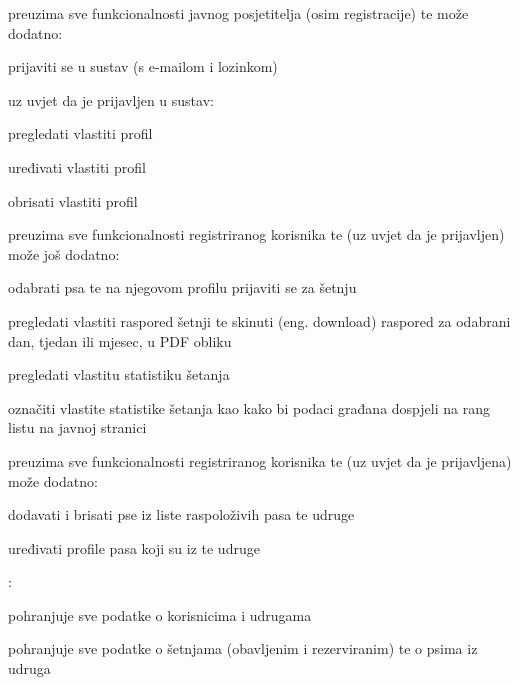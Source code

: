 \begin{packed_enum}
			\item  {} preuzima sve funkcionalnosti javnog posjetitelja (osim registracije) te može dodatno:
			\begin{packed_enum}
				\item prijaviti se u sustav (s e-mailom i lozinkom)
				\item uz uvjet da je prijavljen u sustav:
				\item[]
				\begin{packed_enum}
					\item pregledati vlastiti profil
					\item uređivati vlastiti profil
					\item obrisati vlastiti profil
				\end{packed_enum}	
			\end{packed_enum}
			\vspace{5mm}
		
			\item  {} preuzima sve funkcionalnosti registriranog korisnika te (uz uvjet da je prijavljen) može još dodatno:
			\begin{packed_enum}
				\item odabrati psa te na njegovom profilu prijaviti se za šetnju
				\item pregledati vlastiti raspored šetnji te skinuti (eng. download) raspored za odabrani dan, tjedan ili mjesec, u PDF obliku
				\item pregledati vlastitu statistiku šetanja
				\item označiti vlastite statistike šetanja kao  kako bi podaci građana dospjeli na rang listu na javnoj stranici
			\end{packed_enum}
			\vspace{5mm}
		
			\item  {} preuzima sve funkcionalnosti registriranog korisnika te (uz uvjet da je prijavljena) može dodatno:
			\begin{packed_enum}
				\item dodavati i brisati pse iz liste raspoloživih pasa te udruge
				\item uređivati profile pasa koji su iz te udruge 
			\end{packed_enum}
			\vspace{5mm}
		
			
		
			\item  \underbar{Baza podataka (sudionik)}:
			\begin{packed_enum}
				\item pohranjuje sve podatke o korisnicima i udrugama 
				\item pohranjuje sve podatke o šetnjama (obavljenim i rezerviranim) te o psima iz udruga 
			\end{packed_enum}
		
		\end{packed_enum}
		
